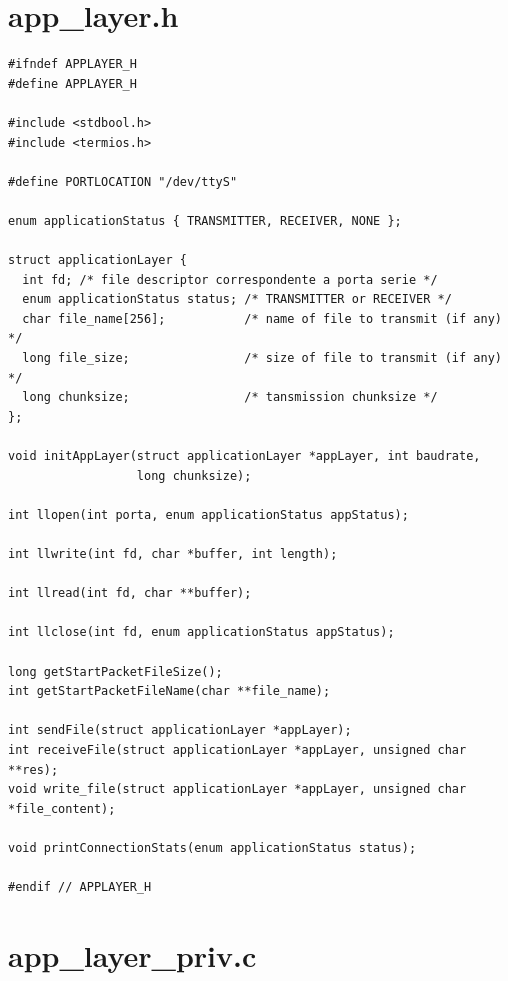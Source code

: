 \documentclass[11pt]{report}
\begin{document}
\section{app\_layer.h}

\begin{lstlisting}
#ifndef APPLAYER_H
#define APPLAYER_H

#include <stdbool.h>
#include <termios.h>

#define PORTLOCATION "/dev/ttyS"

enum applicationStatus { TRANSMITTER, RECEIVER, NONE };

struct applicationLayer {
  int fd; /* file descriptor correspondente a porta serie */
  enum applicationStatus status; /* TRANSMITTER or RECEIVER */
  char file_name[256];           /* name of file to transmit (if any) */
  long file_size;                /* size of file to transmit (if any) */
  long chunksize;                /* tansmission chunksize */
};

void initAppLayer(struct applicationLayer *appLayer, int baudrate,
                  long chunksize);

int llopen(int porta, enum applicationStatus appStatus);

int llwrite(int fd, char *buffer, int length);

int llread(int fd, char **buffer);

int llclose(int fd, enum applicationStatus appStatus);

long getStartPacketFileSize();
int getStartPacketFileName(char **file_name);

int sendFile(struct applicationLayer *appLayer);
int receiveFile(struct applicationLayer *appLayer, unsigned char **res);
void write_file(struct applicationLayer *appLayer, unsigned char *file_content);

void printConnectionStats(enum applicationStatus status);

#endif // APPLAYER_H
\end{lstlisting}

\section{app\_layer\_priv.c}
\end{document}
